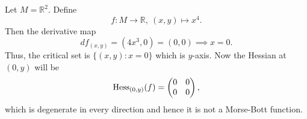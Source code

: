 \begin{eg}
    Let $M=\mathbb{R}^2$. Define
    \begin{displaymath}
        f:M\to \mathbb{R},~(x,y)\mapsto x^4.
    \end{displaymath}
    Then the derivative map 
    \begin{displaymath}
        df_{(x,y)} = \left(4x^3,0\right)=(0,0) \implies x=0.
    \end{displaymath}
    Thus, the critical set is $\{(x,y):x=0\}$ which is $y$-axis. Now the Hessian at $(0,y)$ will be
    \begin{align*}
        \mathrm{Hess}_{(0,y)}(f) = 
        \begin{pmatrix}
            0 & 0 \\ 
            0 & 0
        \end{pmatrix},
    \end{align*}
    which is degenerate in every direction and hence it is not a Morse-Bott function.
\end{eg}

